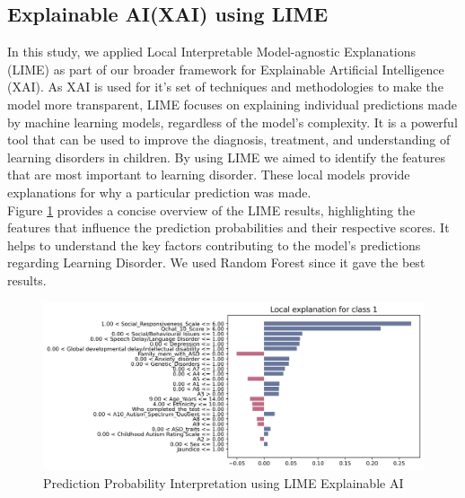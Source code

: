 \documentclass{article}
\begin{document}
\begin{multicols}{2}



\subsection{Explainable AI(XAI) using LIME}

\hspace*{\parindent}In this study, we applied Local Interpretable Model-agnostic Explanations (LIME) as part of our broader framework for Explainable Artificial Intelligence (XAI). As XAI is used for it's set of techniques and methodologies to make the model more transparent, LIME focuses on explaining individual predictions made by machine learning models, regardless of the model's complexity. It is a powerful tool that can be used to improve the diagnosis, treatment, and understanding of learning disorders in children. By using LIME we aimed to identify the features that are most important to learning disorder. These local models provide explanations for why a particular prediction was made.\\
\hspace*{\parindent}
Figure \ref{limeai} provides a concise overview of the LIME results, highlighting the features that influence the prediction probabilities and their respective scores. It helps to understand the key factors contributing to the model's predictions regarding Learning Disorder. We used Random Forest since it gave the best results. \\


\end{multicols}
    \noindent
    \begin{minipage}{\textwidth}
        \begin{figure}[H]
            \centering
            \includegraphics[width=1\textwidth]{images/lime_explanation_hd.png}
            \caption{Prediction Probability Interpretation using LIME Explainable AI}
            \vspace{0.1em}
            \label{limeai}
        \end{figure}
    \end{minipage}
\end{document}
